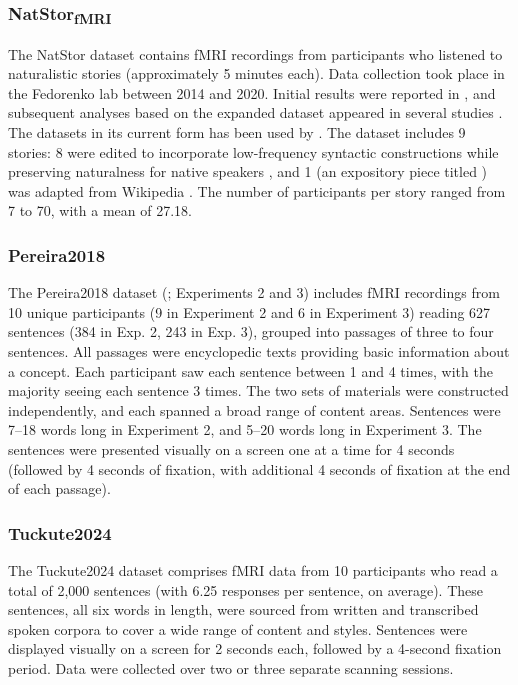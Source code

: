 \documentclass[11pt]{article}
\begin{document}
\subsubsection{NatStor\textsubscript{fMRI}}
The NatStor dataset contains fMRI recordings from participants who listened to naturalistic stories (approximately 5 minutes each). Data collection took place in the Fedorenko lab between 2014 and 2020. Initial results were reported in \citet{blank2014functional}, and subsequent analyses based on the expanded dataset appeared in several studies \citep{paunov2022differential, shain2020fmri, shain2022robust, sueoka2024language, wehbe2021incremental}. The datasets in its current form has been used by \citet{de2025multilingual}. The dataset includes 9 stories: 8 were edited to incorporate low-frequency syntactic constructions while preserving naturalness for native speakers \citep[see][]{futrell2021natural}, and 1 (an expository piece titled ) was adapted from Wikipedia \citep{paunov2022differential}. The number of participants per story ranged from 7 to 70, with a mean of 27.18.

\subsubsection{Pereira2018}

The Pereira2018 dataset (\citealp{pereira}; Experiments 2 and 3) includes fMRI recordings from 10 unique participants (9 in Experiment 2 and 6 in Experiment 3) reading 627 sentences (384 in Exp. 2, 243 in Exp. 3), grouped into passages of three to four sentences. All passages were encyclopedic texts providing basic information about a concept. Each participant saw each sentence between 1 and 4 times, with the majority seeing each sentence 3 times. The two sets of materials were constructed independently, and each spanned a broad range of content areas. Sentences were 7–18 words long in Experiment 2, and 5–20 words long in Experiment 3. The sentences were presented visually on a screen one at a time for 4 seconds (followed by 4 seconds of fixation, with additional 4 seconds of fixation at the end of each passage).

\subsubsection{Tuckute2024}

The Tuckute2024 dataset \citep{tuckute2023driving} comprises fMRI data from 10 participants who read a total of 2,000 sentences (with 6.25 responses per sentence, on average). These sentences, all six words in length, were sourced from written and transcribed spoken corpora to cover a wide range of content and styles. Sentences were displayed visually on a screen for 2 seconds each, followed by a 4-second fixation period. Data were collected over two or three separate scanning sessions.
\end{document}
